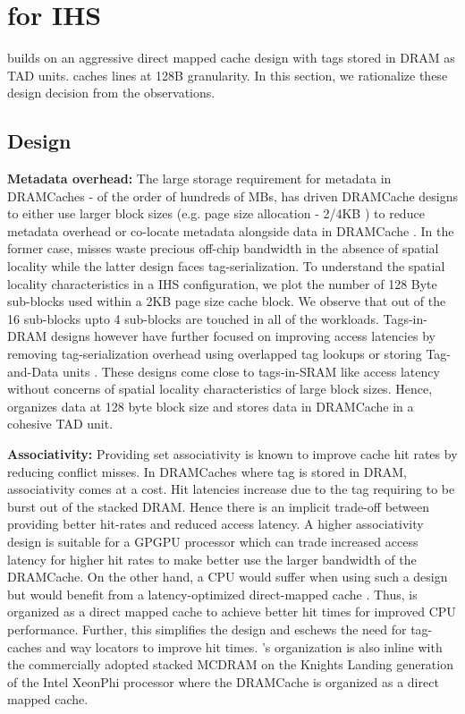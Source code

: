 \section{\cachename for IHS} \label{design}

\cachename builds on an aggressive direct mapped cache design with tags stored in DRAM as TAD units. \cachename caches lines at 128B granularity. In this section, we rationalize these design decision from the observations.

\subsection{\cachename Design} \label{design}

\par \textbf{Metadata overhead:} The large storage requirement for metadata in DRAMCaches - of the order of hundreds of MBs, has driven DRAMCache designs to either use larger block sizes (e.g. page size allocation - 2/4KB \cite{footprint}) to reduce metadata overhead or co-locate metadata alongside data in DRAMCache \cite{loh-hill,alloy,atcache}. In the former case, misses waste precious off-chip bandwidth in the absence of spatial locality while the latter design faces tag-serialization. To understand the spatial locality characteristics in a IHS configuration, we plot the number of 128 Byte sub-blocks used within a 2KB page size cache block. We observe that out of the 16 sub-blocks upto 4 sub-blocks are touched in all of the workloads. 
Tags-in-DRAM designs however have further focused on improving access latencies by removing tag-serialization overhead using overlapped tag lookups \cite{loh-hill} or storing Tag-and-Data units \cite{alloy}. These designs come close to tags-in-SRAM like access latency without concerns of spatial locality characteristics of large block sizes. Hence, \cachename organizes data at 128 byte block size and stores data in DRAMCache in a cohesive TAD unit.

\par \textbf{Associativity:} Providing set associativity is known to improve cache hit rates by reducing conflict misses. In DRAMCaches where tag is stored in DRAM,  associativity comes at a cost. Hit latencies increase due to the tag requiring to be burst out of the stacked DRAM. Hence there is an implicit trade-off between providing better hit-rates and reduced access latency. A higher associativity design is suitable for a GPGPU processor which can trade increased access latency for higher hit rates to make better use the larger bandwidth of the DRAMCache. On the other hand, a CPU would suffer when using such a design but would benefit from a latency-optimized direct-mapped cache \cite{alloy}. Thus, \cachename is organized as a direct mapped cache to achieve better hit times for improved CPU performance. Further, this simplifies the design and eschews the need for tag-caches \cite{atcache} and way locators \cite{bimodal} to improve hit times. \cachename's organization is also inline with the commercially adopted stacked MCDRAM on the Knights Landing generation of the Intel XeonPhi processor \cite{xeonphi} where the DRAMCache is organized as a direct mapped cache.

